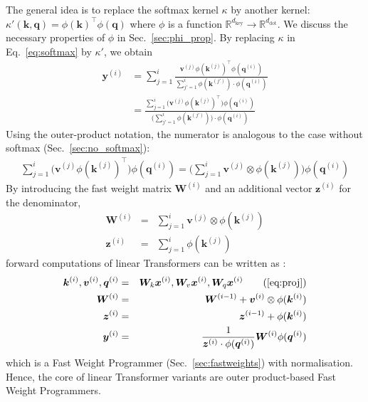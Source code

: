 \documentclass{article}
\def\vk{{\bm{k}}}
\def\vq{{\bm{q}}}
\def\vv{{\bm{v}}}
\def\vx{{\bm{x}}}
\def\vy{{\bm{y}}}
\def\vz{{\bm{z}}}
\def\mW{{\bm{W}}}
\theoremstyle{definition}
\begin{document}
The general idea is to replace the softmax kernel $\kappa$ by another kernel:
$\kappa'(\vk, \vq) = \phi(\vk)^{\top} \phi(\vq)$
where $\phi$ is a function $\mathbb{R}^{d_\text{key}} \rightarrow \mathbb{R}^{d_\text{dot}}$.
We discuss the necessary properties of $\phi$ in Sec.~\ref{sec:phi_prop}.
By replacing $\kappa$ in Eq.~\ref{eq:softmax} by $\kappa'$, we obtain
\begin{align}
\label{eq:linearSM}
    \vy^{(i)} & = \sum_{j=1}^i  \frac{
         \vv^{(j)} \phi(\vk^{(j)})^{\top} \phi(\vq^{(i)})
         }{
         \sum_{j'=1}^i \phi(\vk^{(j')}) \cdot \phi(\vq^{(i)})
         } \\
    & = \displaystyle \frac{ \sum_{j=1}^i
         \big(\vv^{(j)} \phi(\vk^{(j)})^{\top} \big) \phi(\vq^{(i)})
         }{
         \big(\sum_{j'=1}^i \phi(\vk^{(j')})\big) \cdot \phi(\vq^{(i)})
         }
\end{align}
Using the outer-product notation,
the numerator is analogous to the case without softmax (Sec.~\ref{sec:no_softmax}):
\begin{eqnarray}
 \displaystyle \sum_{j=1}^i
         \big(\vv^{(j)} \phi(\vk^{(j)})^{\top} \big) \phi(\vq^{(i)}) = \displaystyle \big(\sum_{j=1}^i
         \vv^{(j)} \otimes \phi(\vk^{(j)}) \big) \phi(\vq^{(i)}) \nonumber
\end{eqnarray}
By introducing the fast weight matrix $\mW^{(i)}$ and an additional vector $\vz^{(i)}$ for the denominator,
\begin{eqnarray}
\mW^{(i)} &=& \sum_{j=1}^i \vv^{(j)} \otimes \phi(\vk^{(j)}) \\
\vz^{(i)} &=& \displaystyle \sum_{j=1}^i \phi(\vk^{(j)})
\end{eqnarray}
forward computations of linear Transformers can be written as \citep{katharopoulos2020transformers}:
\begin{eqnarray}
\vk^{(i)}, \vv^{(i)}, \vq^{(i)} &=& \mW_k \vx^{(i)}, \mW_v \vx^{(i)}, \mW_q \vx^{(i)}  \tag{\ref{eq:proj}}  \\
\mW^{(i)}  &=& \mW^{(i-1)} + \vv^{(i)}  \otimes \phi(\vk^{(i)}) \label{eq:fw_phi_add} \\
\vz^{(i)}  &=& \vz^{(i-1)}+ \phi(\vk^{(i)}) \\
\vy^{(i)}  &=& \displaystyle \dfrac{1}{\vz^{(i)} \cdot \phi(\vq^{(i)})} \mW^{(i)} \phi(\vq^{(i)}) \label{eq:fw_phi_get}
\end{eqnarray}
which is a Fast Weight Programmer (Sec.~\ref{sec:fastweights}) with normalisation.
Hence, the core of  linear Transformer variants 
are outer product-based Fast Weight Programmers.
\end{document}
